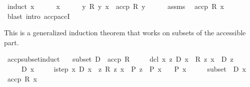 \begin{isabellebody}
\ {\isacharparenleft}{\kern0pt}induct\ x{\isacharparenright}{\kern0pt}\isanewline
\ \ \ \ \isamarkupfalse%
\ x\isanewline
\ \ \ \ \isamarkupfalse%
\ {\isachardoublequoteopen}{\isasymAnd}y{\isachardot}{\kern0pt}\ R{}\ y\ x\ {\isasymLongrightarrow}\ accp\ R{}\ y{\isachardoublequoteclose}\isanewline
\ \ \ \ \isamarkupfalse%
\ assms\ \isamarkupfalse%
\ {\isachardoublequoteopen}accp\ R{}\ x{\isachardoublequoteclose}\isanewline
\ \ \ \ \ \ \isamarkupfalse%
\ {\isacharparenleft}{\kern0pt}blast\ intro{\isacharcolon}{\kern0pt}\ accp{\isachardot}{\kern0pt}accI{\isacharparenright}{\kern0pt}\isanewline
\ \ \isamarkupfalse%
\isanewline
{}\isamarkupfalse%
%
\endisatagproof
{\isafoldproof}%
%
\isadelimproof
%
\endisadelimproof
%
\begin{isamarkuptext}%
This is a generalized induction theorem that works on
  subsets of the accessible part.%
\end{isamarkuptext}\isamarkuptrue%
\isamarkupfalse%
\ accp{\isacharunderscore}{\kern0pt}subset{\isacharunderscore}{\kern0pt}induct{\isacharcolon}{\kern0pt}\isanewline
\ \ \ subset{\isacharcolon}{\kern0pt}\ {\isachardoublequoteopen}D\ {\isasymle}\ accp\ R{\isachardoublequoteclose}\isanewline
\ \ \ \ \ dcl{\isacharcolon}{\kern0pt}\ {\isachardoublequoteopen}{\isasymAnd}x\ z{\isachardot}{\kern0pt}\ D\ x\ {\isasymLongrightarrow}\ R\ z\ x\ {\isasymLongrightarrow}\ D\ z{\isachardoublequoteclose}\isanewline
\ \ \ \ \ {\isachardoublequoteopen}D\ x{\isachardoublequoteclose}\isanewline
\ \ \ \ \ istep{\isacharcolon}{\kern0pt}\ {\isachardoublequoteopen}{\isasymAnd}x{\isachardot}{\kern0pt}\ D\ x\ {\isasymLongrightarrow}\ {\isacharparenleft}{\kern0pt}{\isasymAnd}z{\isachardot}{\kern0pt}\ R\ z\ x\ {\isasymLongrightarrow}\ P\ z{\isacharparenright}{\kern0pt}\ {\isasymLongrightarrow}\ P\ x{\isachardoublequoteclose}\isanewline
\ \ \ {\isachardoublequoteopen}P\ x{\isachardoublequoteclose}\isanewline
%
\isadelimproof
%
\endisadelimproof
%
\isatagproof
{}\isamarkupfalse%
\ {\isacharminus}{\kern0pt}\isanewline
\ \ \isamarkupfalse%
\ subset\ \ {\isacartoucheopen}D\ x{\isacartoucheclose}\isanewline
\ \ \isamarkupfalse%
\ {\isachardoublequoteopen}accp\ R\ x{\isachardoublequoteclose}\ \isacommand{{\isachardot}{\kern0pt}{\isachardot}{\kern0pt}}\isamarkupfalse%
\isanewline

\end{isabellebody}
